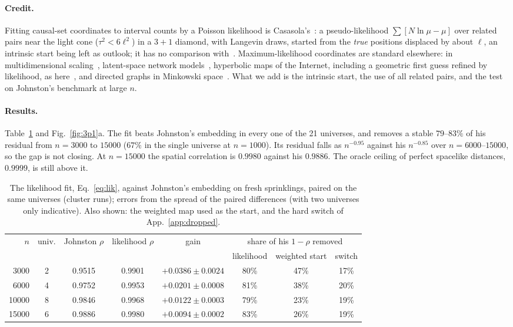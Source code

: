 \documentclass[11pt,a4paper]{article}
\begin{document}
\paragraph{Credit.} Fitting causal-set coordinates to interval counts by a Poisson likelihood is Casasola's~\cite{Casasola26}: a pseudo-likelihood $\sum[N\ln\mu-\mu]$ over related pairs near the light cone ($\tau^2<6\ell^2$) in a $3+1$ diamond, with Langevin draws, started from the \emph{true} positions displaced by about $\ell$, an intrinsic start being left as outlook; it has no comparison with~\cite{Johnston25}. Maximum-likelihood coordinates are standard elsewhere: in multidimensional scaling~\cite{Ramsay77}, latent-space network models~\cite{Hoff02}, hyperbolic maps of the Internet, including a geometric first guess refined by likelihood, as here~\cite{BPK10,Mercator19}, and directed graphs in Minkowski space~\cite{Sim21}. What we add is the intrinsic start, the use of all related pairs, and the test on Johnston's benchmark at large $n$.

\paragraph{Results.} Table~\ref{tab:lik} and Fig.~\ref{fig:3p1}a. The fit beats Johnston's embedding in every one of the 21 universes, and removes a stable $79$--$83\%$ of his residual from $n=3000$ to $15000$ ($67\%$ in the single universe at $n=1000$). Its residual falls as $n^{-0.95}$ against his $n^{-0.85}$ over $n=6000$--$15000$, so the gap is not closing. At $n=15000$ the spatial correlation is $0.9980$ against his $0.9886$. The oracle ceiling of perfect spacelike distances, $0.9999$, is still above it.

\begin{table}[t]
\centering\small
\begin{tabular}{@{}rccccccc@{}}
\toprule
$n$ & univ. & Johnston $\rho$ & likelihood $\rho$ & gain & \multicolumn{3}{c}{share of his $1-\rho$ removed}\\
\cmidrule(l){6-8}
 & & & & & likelihood & weighted start & switch\\
\midrule
3000 & 2 & 0.9515 & 0.9901 & $+0.0386\pm0.0024$ & 80\% & 47\% & 17\%\\
6000 & 4 & 0.9752 & 0.9953 & $+0.0201\pm0.0008$ & 81\% & 38\% & 20\%\\
10000 & 8 & 0.9846 & 0.9968 & $+0.0122\pm0.0003$ & 79\% & 23\% & 19\%\\
15000 & 6 & 0.9886 & 0.9980 & $+0.0094\pm0.0002$ & 83\% & 26\% & 19\%\\
\bottomrule
\end{tabular}
\caption{The likelihood fit, Eq.~\eqref{eq:lik}, against Johnston's embedding on fresh sprinklings, paired on the same universes (cluster runs); errors from the spread of the paired differences (with two universes only indicative). Also shown: the weighted map used as the start, and the hard switch of App.~\ref{app:dropped}.}
\label{tab:lik}
\end{table}
\end{document}
